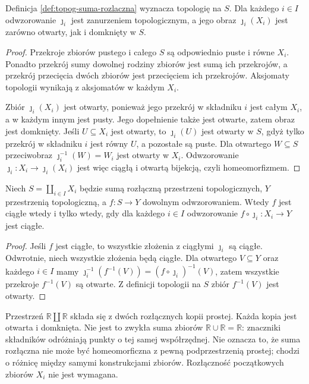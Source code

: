 \begin{stwierdzenie}
\label{prop:topog-suma-rozlaczna-topologia}
Definicja \ref{def:topog-suma-rozlaczna} wyznacza topologię
na $S$. Dla każdego $i\in I$ odwzorowanie $\jmath_i$
jest zanurzeniem topologicznym, a jego obraz
$\jmath_i(X_i)$ jest zarówno otwarty, jak i domknięty w $S$.
\end{stwierdzenie}
\begin{proof}
Przekroje zbiorów pustego i całego $S$ są odpowiednio
puste i równe $X_i$. Ponadto przekrój sumy dowolnej
rodziny zbiorów jest sumą ich przekrojów, a przekrój
przecięcia dwóch zbiorów jest przecięciem ich przekrojów.
Aksjomaty topologii wynikają z aksjomatów w każdym $X_i$.

Zbiór $\jmath_i(X_i)$ jest otwarty, ponieważ jego przekrój
w składniku $i$ jest całym $X_i$, a w każdym innym jest
pusty. Jego dopełnienie także jest otwarte, zatem obraz
jest domknięty. Jeśli $U\subseteq X_i$ jest otwarty,
to $\jmath_i(U)$ jest otwarty w $S$, gdyż tylko przekrój
w składniku $i$ jest równy $U$, a pozostałe są puste.
Dla otwartego $W\subseteq S$ przeciwobraz
$\jmath_i^{-1}(W)=W_i$ jest otwarty w $X_i$.
Odwzorowanie $\jmath_i\colon X_i\to\jmath_i(X_i)$
jest więc ciągłą i otwartą bijekcją, czyli homeomorfizmem.
\end{proof}

\begin{twierdzenie}
\label{thm:topog-suma-uniwersalnosc}
Niech $S=\coprod_{i\in I}X_i$ będzie sumą rozłączną
przestrzeni topologicznych, $Y$ przestrzenią topologiczną,
a $f\colon S\to Y$ dowolnym odwzorowaniem. Wtedy $f$
jest ciągłe wtedy i tylko wtedy, gdy dla każdego $i\in I$
odwzorowanie $f\circ\jmath_i\colon X_i\to Y$ jest ciągłe.
\end{twierdzenie}
\begin{proof}
Jeśli $f$ jest ciągłe, to wszystkie złożenia z ciągłymi
$\jmath_i$ są ciągłe. Odwrotnie, niech wszystkie złożenia
będą ciągłe. Dla otwartego $V\subseteq Y$ oraz każdego
$i\in I$ mamy
$\jmath_i^{-1}(f^{-1}(V))=(f\circ\jmath_i)^{-1}(V)$,
zatem wszystkie przekroje $f^{-1}(V)$ są otwarte.
Z definicji topologii na $S$ zbiór $f^{-1}(V)$ jest otwarty.
\end{proof}

\begin{przyklad}
\label{ex:topog-dwie-kopie}
Przestrzeń $\mathbb R\coprod\mathbb R$ składa się z dwóch
rozłącznych kopii prostej. Każda kopia jest otwarta i
domknięta. Nie jest to zwykła suma zbiorów
$\mathbb R\cup\mathbb R=\mathbb R$: znaczniki składników
odróżniają punkty o tej samej współrzędnej.
Nie oznacza to, że suma rozłączna nie może być homeomorficzna
z pewną podprzestrzenią prostej; chodzi o różnicę
między samymi konstrukcjami zbiorów.
Rozłączność początkowych zbiorów $X_i$ nie jest wymagana.
\end{przyklad}

